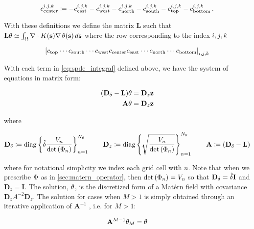\begin{linenomath*}\begin{equation*}
    c_\text{center}^{i,j,k} \coloneqq
        - c_\text{east}^{i,j,k} - c_\text{west}^{i,j,k}
        - c_\text{north}^{i,j,k} - c_\text{south}^{i,j,k}
        - c_\text{top}^{i,j,k} - c_\text{bottom}^{i,j,k} \, .
\end{equation*}\end{linenomath*}
With these definitions we define the matrix $\mathbf{L}$ such that
$\mathbf{L} \mathbf{\theta} \simeq \int_{\Omega} \nabla\cdot K(\mathbf{s})\nabla \, \theta(\mathbf{s})\,d\mathbf{s}$
where the row corresponding to the index ${i,j,k}$
\begin{linenomath*}\begin{equation*}
    \left[ c_\text{top} \cdots c_\text{south} \cdots
           c_\text{west} c_\text{center} c_\text{east} \cdots
           c_\text{north} \cdots c_\text{bottom}
       \right]_{{i,j,k}}
\end{equation*}\end{linenomath*}

With each term in \cref{eq:spde_integral} defined above, we have the system of
equations in matrix form:
\begin{linenomath*}\begin{equation}
    \begin{aligned}
        (\mathbf{D}_\delta - \mathbf{L}) \mathbf{\theta} &= \mathbf{D}_z\mathbf{z}\\
        \mathbf{A}\mathbf{\theta} &= \mathbf{D}_z\mathbf{z}
    \end{aligned}
    \label{eq:fv_spde}
\end{equation}\end{linenomath*}
where
\begin{linenomath*}\begin{equation*}
    \begin{aligned}
        \mathbf{D}_\delta \coloneqq \text{diag}
            \left\{
                \hat{\delta}\dfrac{V_n}{\text{det}\left(\Phi_{n}\right)}
            \right\}_{n=1}^{N_{\theta}}
            \qquad
        \mathbf{D}_z \coloneqq \text{diag}
            \left\{
                \sqrt{\dfrac{V_n}{\text{det}\left(\Phi_{n}\right)}}
            \right\}_{n=1}^{N_{\theta}}
            \qquad
            \mathbf{A} \coloneqq \left(\mathbf{D}_\delta - \mathbf{L}\right)
    \end{aligned}
\end{equation*}\end{linenomath*}
where for notational simplicity we index each grid cell with $n$.
Note that when we prescribe $\Phi$ as in \cref{sec:matern_operator},
then $\text{det}\left(\Phi_{n}\right) = V_n$ so that $\mathbf{D}_\delta = \hat{\delta} \mathbf{I}$
and $\mathbf{D}_z = \mathbf{I}$.
The solution, $\mathbf{\theta}$, is the discretized form of a Mat\'ern field with
covariance $\mathbf{D}_z A^{-2} \mathbf{D}_z$.
The solution for cases when $M>1$ is simply obtained through an iterative
application of $\mathbf{A}^{-1}$ , i.e. for $M>1$:
\begin{linenomath*}\begin{equation*}
    \mathbf{A}^{M-1} \mathbf{\theta}_M = \mathbf{\theta}
\end{equation*}\end{linenomath*}



